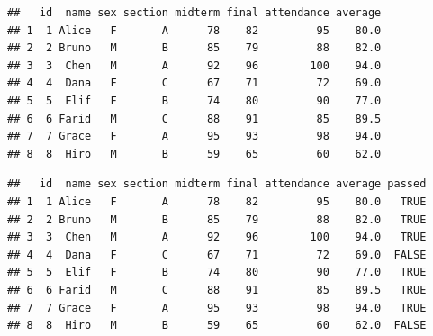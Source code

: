 \documentclass[
]{article}
\newenvironment{Shaded}{\begin{snugshade}}{\end{snugshade}}
\newcommand{\CommentTok}[1]{\textcolor[rgb]{0.56,0.35,0.01}{\textit{#1}}}
\newcommand{\DecValTok}[1]{\textcolor[rgb]{0.00,0.00,0.81}{#1}}
\newcommand{\FunctionTok}[1]{\textcolor[rgb]{0.13,0.29,0.53}{\textbf{#1}}}
\newcommand{\NormalTok}[1]{#1}
\newcommand{\OtherTok}[1]{\textcolor[rgb]{0.56,0.35,0.01}{#1}}
\newcommand{\SpecialCharTok}[1]{\textcolor[rgb]{0.81,0.36,0.00}{\textbf{#1}}}
\begin{document}
\begin{Shaded}
\end{Shaded}

\begin{verbatim}
##   id  name sex section midterm final attendance average
## 1  1 Alice   F       A      78    82         95    80.0
## 2  2 Bruno   M       B      85    79         88    82.0
## 3  3  Chen   M       A      92    96        100    94.0
## 4  4  Dana   F       C      67    71         72    69.0
## 5  5  Elif   F       B      74    80         90    77.0
## 6  6 Farid   M       C      88    91         85    89.5
## 7  7 Grace   F       A      95    93         98    94.0
## 8  8  Hiro   M       B      59    65         60    62.0
\end{verbatim}

\begin{Shaded}
\end{Shaded}

\begin{verbatim}
##   id  name sex section midterm final attendance average passed
## 1  1 Alice   F       A      78    82         95    80.0   TRUE
## 2  2 Bruno   M       B      85    79         88    82.0   TRUE
## 3  3  Chen   M       A      92    96        100    94.0   TRUE
## 4  4  Dana   F       C      67    71         72    69.0  FALSE
## 5  5  Elif   F       B      74    80         90    77.0   TRUE
## 6  6 Farid   M       C      88    91         85    89.5   TRUE
## 7  7 Grace   F       A      95    93         98    94.0   TRUE
## 8  8  Hiro   M       B      59    65         60    62.0  FALSE
\end{verbatim}
\end{document}
